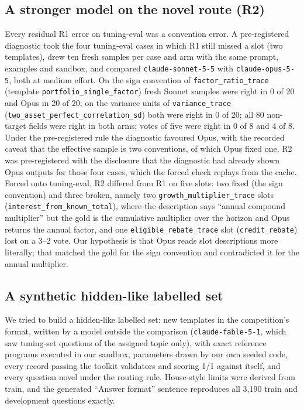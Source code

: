 \documentclass[conference]{IEEEtran}
\newcommand{\id}[1]{\texttt{#1}}
\begin{document}
\subsection{A stronger model on the novel route (R2)}\label{sec:opus}
Every residual R1 error on tuning-eval was a convention error. A pre-registered diagnostic took the four tuning-eval cases in which R1 still missed a slot (two templates), drew ten fresh samples per case and arm with the same prompt, examples and sandbox, and compared \id{claude-sonnet-5-5} with \id{claude-opus-5-5}, both at medium effort. On the sign convention of \id{factor\_ratio\_trace} (template \id{portfolio\_single\_factor}) fresh Sonnet samples were right in 0 of 20 and Opus in 20 of 20; on the variance units of \id{variance\_trace} (\id{two\_asset\_perfect\_correlation\_sd}) both were right in 0 of 20; all 80 non-target fields were right in both arms; votes of five were right in 0 of 8 and 4 of 8. Under the pre-registered rule the diagnostic favoured Opus, with the recorded caveat that the effective sample is two conventions, of which Opus fixed one. R2 was pre-registered with the disclosure that the diagnostic had already shown Opus outputs for those four cases, which the forced check replays from the cache. Forced onto tuning-eval, R2 differed from R1 on five slots: two fixed (the sign convention) and three broken, namely two \id{growth\_multiplier\_trace} slots (\id{interest\_from\_known\_total}), where the description says ``annual compound multiplier'' but the gold is the cumulative multiplier over the horizon and Opus returns the annual factor, and one \id{eligible\_rebate\_trace} slot (\id{credit\_rebate}) lost on a 3--2 vote. Our hypothesis is that Opus reads slot descriptions more literally; that matched the gold for the sign convention and contradicted it for the annual multiplier.

\subsection{A synthetic hidden-like labelled set}
We tried to build a hidden-like labelled set: new templates in the competition's format, written by a model outside the comparison (\id{claude-fable-5-1}, which saw tuning-set questions of the assigned topic only), with exact reference programs executed in our sandbox, parameters drawn by our own seeded code, every record passing the toolkit validators and scoring 1/1 against itself, and every question novel under the routing rule. House-style limits were derived from train, and the generated ``Answer format'' sentence reproduces all 3,190 train and development questions exactly.
\end{document}
